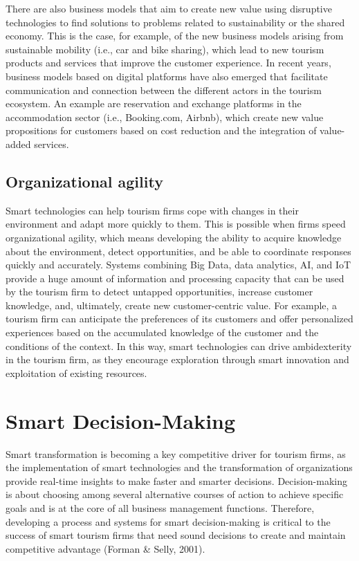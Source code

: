 \documentclass[
  letterpaper,
  DIV=11,
  numbers=noendperiod]{scrreprt}
\begin{document}
There are also business models that aim to create new value using
disruptive technologies to find solutions to problems related to
sustainability or the shared economy. This is the case, for example, of
the new business models arising from sustainable mobility (i.e., car and
bike sharing), which lead to new tourism products and services that
improve the customer experience. In recent years, business models based
on digital platforms have also emerged that facilitate communication and
connection between the different actors in the tourism ecosystem. An
example are reservation and exchange platforms in the accommodation
sector (i.e., Booking.com, Airbnb), which create new value propositions
for customers based on cost reduction and the integration of value-added
services.

\hypertarget{organizational-agility}{%
\subsection{Organizational agility}\label{organizational-agility}}

Smart technologies can help tourism firms cope with changes in their
environment and adapt more quickly to them. This is possible when firms
speed organizational agility, which means developing the ability to
acquire knowledge about the environment, detect opportunities, and be
able to coordinate responses quickly and accurately. Systems combining
Big Data, data analytics, AI, and IoT provide a huge amount of
information and processing capacity that can be used by the tourism firm
to detect untapped opportunities, increase customer knowledge, and,
ultimately, create new customer-centric value. For example, a tourism
firm can anticipate the preferences of its customers and offer
personalized experiences based on the accumulated knowledge of the
customer and the conditions of the context. In this way, smart
technologies can drive ambidexterity in the tourism firm, as they
encourage exploration through smart innovation and exploitation of
existing resources.

\hypertarget{smart-decision-making}{%
\section{Smart Decision-Making}\label{smart-decision-making}}

Smart transformation is becoming a key competitive driver for tourism
firms, as the implementation of smart technologies and the
transformation of organizations provide real-time insights to make
faster and smarter decisions. Decision-making is about choosing among
several alternative courses of action to achieve specific goals and is
at the core of all business management functions. Therefore, developing
a process and systems for smart decision-making is critical to the
success of smart tourism firms that need sound decisions to create and
maintain competitive advantage (Forman \& Selly, 2001).
\end{document}
